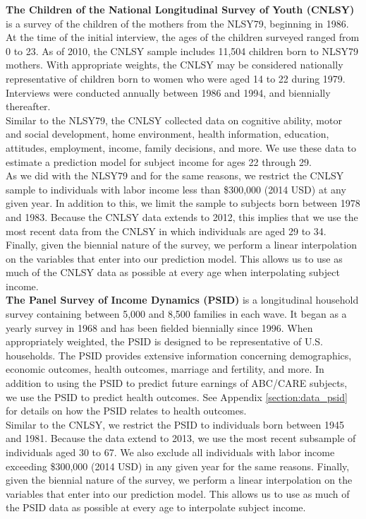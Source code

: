 \noindent \textbf{The Children of the National Longitudinal Survey of Youth (CNLSY)} is a survey of the children of the mothers from the NLSY79, beginning in 1986. At the time of the initial interview, the ages of the children surveyed ranged from 0 to 23. As of 2010, the CNLSY sample includes 11,504 children born to NLSY79 mothers. With appropriate weights, the CNLSY may be considered nationally representative of children born to women who were aged 14 to 22 during 1979. Interviews were conducted annually between 1986 and 1994, and biennially thereafter. \\

\noindent Similar to the NLSY79, the CNLSY collected data on cognitive ability, motor and social development, home environment, health information, education, attitudes, employment, income, family decisions, and more. We use these data to estimate a prediction model for subject income for ages 22 through 29. \\

\noindent As we did with the NLSY79 and for the same reasons, we restrict the CNLSY sample to individuals with labor income less than \$300,000 (2014 USD) at any given year. In addition to this, we limit the sample to subjects born between 1978 and 1983. Because the CNLSY data extends to 2012, this implies that we use the most recent data from the CNLSY in which individuals are aged 29 to 34. Finally, given the biennial nature of the survey, we perform a linear interpolation on the variables that enter into our prediction model. This allows us to use as much of the CNLSY data as possible at every age when interpolating subject income. \\

\noindent \textbf{The Panel Survey of Income Dynamics (PSID)} is a longitudinal household survey containing between 5,000 and 8,500 families in each wave. It began as a yearly survey in 1968 and has been fielded biennially since 1996. When appropriately weighted, the PSID is designed to be representative of U.S. households. The PSID provides extensive information concerning demographics, economic outcomes, health outcomes, marriage and fertility, and more. In addition to using the PSID to predict future earnings of ABC/CARE subjects, we use the PSID to predict health outcomes. See Appendix \ref{section:data_psid} for details on how the PSID relates to health outcomes. \\

\noindent Similar to the CNLSY, we restrict the PSID to individuals born between 1945 and 1981. Because the data extend to 2013, we use the most recent subsample of individuals aged 30 to 67. We also exclude all individuals with labor income exceeding \$300,000 (2014 USD) in any given year for the same reasons. Finally, given the biennial nature of the survey, we perform a linear interpolation on the variables that enter into our prediction model. This allows us to use as much of the PSID data as possible at every age to interpolate subject income. \\

